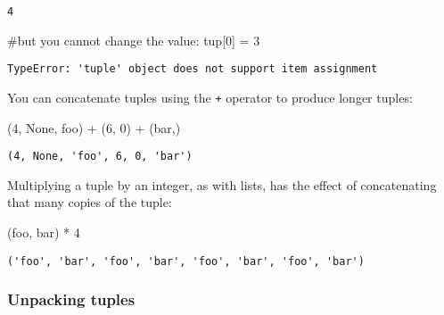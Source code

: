 \documentclass[
  letterpaper,
  DIV=11,
  numbers=noendperiod]{scrreprt}
\newenvironment{Shaded}{\begin{snugshade}}{\end{snugshade}}
\newcommand{\CommentTok}[1]{\textcolor[rgb]{0.37,0.37,0.37}{#1}}
\newcommand{\DecValTok}[1]{\textcolor[rgb]{0.68,0.00,0.00}{#1}}
\newcommand{\NormalTok}[1]{\textcolor[rgb]{0.00,0.23,0.31}{#1}}
\newcommand{\OperatorTok}[1]{\textcolor[rgb]{0.37,0.37,0.37}{#1}}
\newcommand{\StringTok}[1]{\textcolor[rgb]{0.13,0.47,0.30}{#1}}
\newcommand{\VariableTok}[1]{\textcolor[rgb]{0.07,0.07,0.07}{#1}}
\begin{document}
\begin{verbatim}
4
\end{verbatim}

\begin{Shaded}
\begin{Highlighting}[]
\CommentTok{\#but you cannot change the value:}
\NormalTok{tup[}\DecValTok{0}\NormalTok{] }\OperatorTok{=} \DecValTok{3}
\end{Highlighting}
\end{Shaded}

\begin{verbatim}
TypeError: 'tuple' object does not support item assignment
\end{verbatim}

You can concatenate tuples using the \texttt{+} operator to produce
longer tuples:

\begin{Shaded}
\begin{Highlighting}[]
\NormalTok{(}\DecValTok{4}\NormalTok{, }\VariableTok{None}\NormalTok{, }\StringTok{\textquotesingle{}foo\textquotesingle{}}\NormalTok{) }\OperatorTok{+}\NormalTok{ (}\DecValTok{6}\NormalTok{, }\DecValTok{0}\NormalTok{) }\OperatorTok{+}\NormalTok{ (}\StringTok{\textquotesingle{}bar\textquotesingle{}}\NormalTok{,)}
\end{Highlighting}
\end{Shaded}

\begin{verbatim}
(4, None, 'foo', 6, 0, 'bar')
\end{verbatim}

Multiplying a tuple by an integer, as with lists, has the effect of
concatenating that many copies of the tuple:

\begin{Shaded}
\begin{Highlighting}[]
\NormalTok{(}\StringTok{\textquotesingle{}foo\textquotesingle{}}\NormalTok{, }\StringTok{\textquotesingle{}bar\textquotesingle{}}\NormalTok{) }\OperatorTok{*} \DecValTok{4}
\end{Highlighting}
\end{Shaded}

\begin{verbatim}
('foo', 'bar', 'foo', 'bar', 'foo', 'bar', 'foo', 'bar')
\end{verbatim}

\hypertarget{unpacking-tuples}{%
\subsubsection{Unpacking tuples}\label{unpacking-tuples}}
\end{document}
